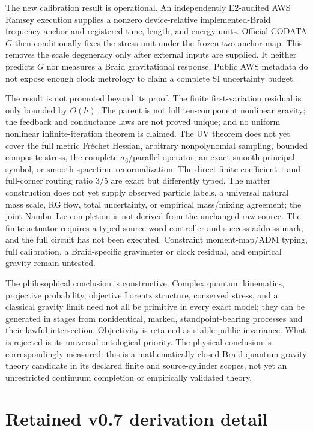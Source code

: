 \documentclass[11pt]{article}
\theoremstyle{definition}
\theoremstyle{remark}
\begin{document}
The new calibration result is operational. An independently E2-audited AWS Ramsey execution supplies a nonzero device-relative implemented-Braid frequency anchor and registered time, length, and energy units. Official CODATA $G$ then conditionally fixes the stress unit under the frozen two-anchor map. This removes the scale degeneracy only after external inputs are supplied. It neither predicts $G$ nor measures a Braid gravitational response. Public AWS metadata do not expose enough clock metrology to claim a complete SI uncertainty budget.

The result is not promoted beyond its proof. The finite first-variation residual is only bounded by $O(h)$. The parent is not full ten-component nonlinear gravity; the feedback and conductance laws are not proved unique; and no uniform nonlinear infinite-iteration theorem is claimed. The UV theorem does not yet cover the full metric Fr\'echet Hessian, arbitrary nonpolynomial sampling, bounded composite stress, the complete $\sigma_6$/parallel operator, an exact smooth principal symbol, or smooth-spacetime renormalization. The direct finite coefficient $1$ and full-corner routing ratio $3/5$ are exact but differently typed. The matter construction does not yet supply observed particle labels, a universal natural mass scale, RG flow, total uncertainty, or empirical mass/mixing agreement; the joint Nambu--Lie completion is not derived from the unchanged raw source. The finite actuator requires a typed source-word controller and success-address mark, and the full circuit has not been executed. Constraint moment-map/ADM typing, full calibration, a Braid-specific gravimeter or clock residual, and empirical gravity remain untested.

The philosophical conclusion is constructive. Complex quantum kinematics, projective probability, objective Lorentz structure, conserved stress, and a classical gravity limit need not all be primitive in every exact model; they can be generated in stages from nonidentical, marked, standpoint-bearing processes and their lawful intersection. Objectivity is retained as stable public invariance. What is rejected is its universal ontological priority. The physical conclusion is correspondingly measured: this is a mathematically closed Braid quantum-gravity theory candidate in its declared finite and source-cylinder scopes, not yet an unrestricted continuum completion or empirically validated theory.

\appendix
\section*{Retained v0.7 derivation detail}
\end{document}

